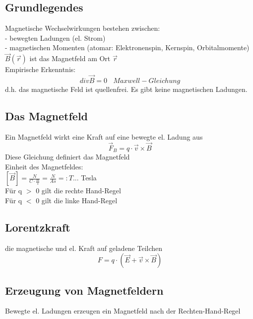 \documentclass[a4paper,12pt]{report}
\begin{document}
\subsection{Grundlegendes}
Magnetische Wechselwirkungen bestehen zwischen:\\
- bewegten Ladungen (el. Strom)\\
- magnetischen Momenten (atomar: Elektronenspin, Kernspin, Orbitalmomente)\\

$ \vec{B} (\vec{r}) $ ist das Magnetfeld am Ort $ \vec{r} $ \\
Empirische Erkenntnis:\\
\begin{equation}
div \vec{B} = 0 \ \ \ \ Maxwell - Gleichung
\end{equation}
d.h. das magnetische Feld ist quellenfrei. Es gibt keine magnetischen Ladungen.\\

\subsection{Das Magnetfeld}
Ein Magnetfeld wirkt eine Kraft auf eine bewegte el. Ladung aus
\begin{equation}
\vec{F}_B = q\cdot \vec{v} \times \vec{B}
\end{equation}
Diese Gleichung definiert das Magnetfeld\\
Einheit des Magnetfeldes:\\
$ [\vec{B}] = \frac{N}{C \cdot \frac{m}{s}} = \frac{N}{As} =: T  $... Tesla \\

Für q $>$ 0 gilt die rechte Hand-Regel\\
Für q $<$ 0 gilt die linke Hand-Regel\\

\subsection{Lorentzkraft}
die magnetische und el. Kraft auf geladene Teilchen\\
\begin{equation}
F = q \cdot (\vec{E} + \vec{v} \times \vec{B})
\end{equation}

\subsection{Erzeugung von Magnetfeldern}
Bewegte el. Ladungen erzeugen ein Magnetfeld nach der Rechten-Hand-Regel\\
\end{document}
